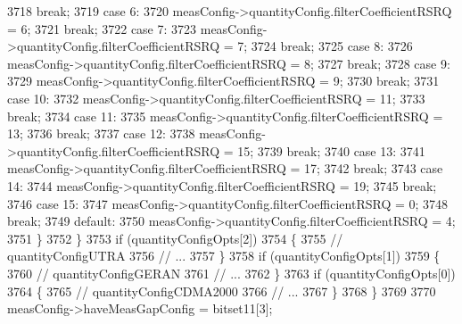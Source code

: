 \begin{DoxyCode}
3718               \textcolor{keywordflow}{break};
3719             \textcolor{keywordflow}{case} 6:
3720               measConfig->quantityConfig.filterCoefficientRSRQ = 6;
3721               \textcolor{keywordflow}{break};
3722             \textcolor{keywordflow}{case} 7:
3723               measConfig->quantityConfig.filterCoefficientRSRQ = 7;
3724               \textcolor{keywordflow}{break};
3725             \textcolor{keywordflow}{case} 8:
3726               measConfig->quantityConfig.filterCoefficientRSRQ = 8;
3727               \textcolor{keywordflow}{break};
3728             \textcolor{keywordflow}{case} 9:
3729               measConfig->quantityConfig.filterCoefficientRSRQ = 9;
3730               \textcolor{keywordflow}{break};
3731             \textcolor{keywordflow}{case} 10:
3732               measConfig->quantityConfig.filterCoefficientRSRQ = 11;
3733               \textcolor{keywordflow}{break};
3734             \textcolor{keywordflow}{case} 11:
3735               measConfig->quantityConfig.filterCoefficientRSRQ = 13;
3736               \textcolor{keywordflow}{break};
3737             \textcolor{keywordflow}{case} 12:
3738               measConfig->quantityConfig.filterCoefficientRSRQ = 15;
3739               \textcolor{keywordflow}{break};
3740             \textcolor{keywordflow}{case} 13:
3741               measConfig->quantityConfig.filterCoefficientRSRQ = 17;
3742               \textcolor{keywordflow}{break};
3743             \textcolor{keywordflow}{case} 14:
3744               measConfig->quantityConfig.filterCoefficientRSRQ = 19;
3745               \textcolor{keywordflow}{break};
3746             \textcolor{keywordflow}{case} 15:
3747               measConfig->quantityConfig.filterCoefficientRSRQ = 0;
3748               \textcolor{keywordflow}{break};
3749             \textcolor{keywordflow}{default}:
3750               measConfig->quantityConfig.filterCoefficientRSRQ = 4;
3751             \}
3752         \}
3753       \textcolor{keywordflow}{if} (quantityConfigOpts[2])
3754         \{
3755           \textcolor{comment}{// quantityConfigUTRA}
3756           \textcolor{comment}{// ...}
3757         \}
3758       \textcolor{keywordflow}{if} (quantityConfigOpts[1])
3759         \{
3760           \textcolor{comment}{// quantityConfigGERAN}
3761           \textcolor{comment}{// ...}
3762         \}
3763       \textcolor{keywordflow}{if} (quantityConfigOpts[0])
3764         \{
3765           \textcolor{comment}{// quantityConfigCDMA2000}
3766           \textcolor{comment}{// ...}
3767         \}
3768     \}
3769 
3770   measConfig->haveMeasGapConfig = bitset11[3];

\end{DoxyCode}
